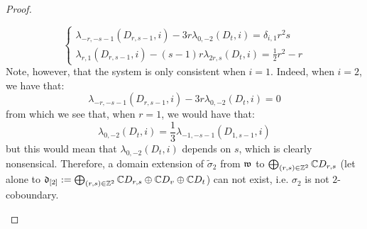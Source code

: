 \begin{proof}
\begin{enumerate}
$$\begin{cases}
                                \lambda_{-r, -s - 1}(D_{r, s - 1}, i) -3r\lambda_{0, -2}(D_t, i) = \delta_{i, 1} r^2 s
                                \\
                                \lambda_{r, 1}(D_{r, s - 1}, i) - (s - 1)r\lambda_{2r, s}(D_t, i) = \frac12 r^2 - r
                            \end{cases}
                        $$
                    Note, however, that the system is only consistent when $i = 1$. Indeed, when $i = 2$, we have that:
                        $$\lambda_{-r, -s - 1}(D_{r, s - 1}, i) -3r\lambda_{0, -2}(D_t, i) = 0$$
                    from which we see that, when $r = 1$, we would have that:
                        $$\lambda_{0, -2}(D_t, i) = \frac13 \lambda_{-1, -s - 1}(D_{1, s - 1}, i)$$
                    but this would mean that $\lambda_{0, -2}(D_t, i)$ depends on $s$, which is clearly nonsensical. Therefore, a domain extension of $\tilde{\sigma}_2$ from $\mathfrak{w}$ to $\bigoplus_{(r, s) \in \mathbb{Z}^2} \mathbb{C} D_{r, s}$ (let alone to $\mathfrak{d}_{[2]} := \bigoplus_{(r, s) \in \mathbb{Z}^2} \mathbb{C} D_{r, s} \oplus \mathbb{C} D_v \oplus \mathbb{C} D_t$) can not exist, i.e. $\sigma_2$ is not $2$-coboundary.
                        
                    

\end{enumerate}
\end{proof}
